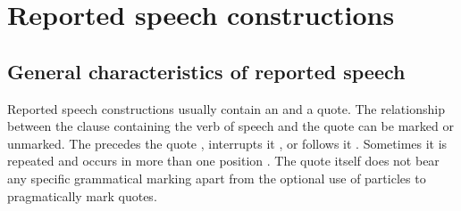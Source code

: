 



\section{Reported speech constructions}
\label{sec:Reported speech constructions}



\subsection{General characteristics of reported speech}
\label{ssec:General characteristics of reported speech}

Reported speech constructions usually contain an  and a quote. The relationship between the clause containing the verb of speech and the quote can be marked or unmarked. The  precedes the quote , interrupts it , or follows it . Sometimes it is repeated and occurs in more than one position . The quote itself does not bear any specific grammatical marking apart from the optional use of  particles to pragmatically mark quotes.

